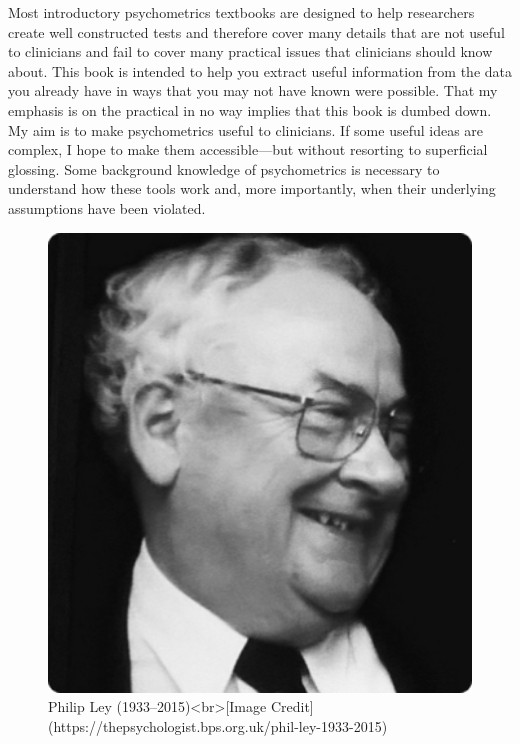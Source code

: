 \documentclass[
]{book}
\begin{document}
Most introductory psychometrics textbooks are designed to help researchers create well constructed tests and therefore cover many details that are not useful to clinicians and fail to cover many practical issues that clinicians should know about. This book is intended to help you extract useful information from the data you already have in ways that you may not have known were possible. That my emphasis is on the practical in no way implies that this book is dumbed down. My aim is to make psychometrics useful to clinicians. If some useful ideas are complex, I hope to make them accessible---but without resorting to superficial glossing. Some background knowledge of psychometrics is necessary to understand how these tools work and, more importantly, when their underlying assumptions have been violated.

\begin{figure}

{\centering \includegraphics[width=4.56in]{Philley2} 

}

\caption{Philip Ley (1933--2015)<br>[Image Credit](https://thepsychologist.bps.org.uk/phil-ley-1933-2015)}\label{fig:philipley}
\end{figure}
\end{document}

